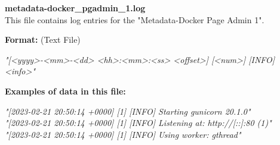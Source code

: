 \begin{description}
\begin{addmargin}[0em]{0em}
    \label{metadata-docker_pgadmin_1.log}
    \begin{addmargin}[1em]{0em} %
        \textbf{metadata-docker\_pgadmin\_1.log}\\
        This file contains log entries for the "Metadata-Docker Page Admin 1".
        \begin{addmargin}[1em]{0em}
            \textbf{Format:} (Text File)
            \begin{addmargin}[1em]{0em}
                \textit{"[<yyyy>-<mm>-<dd> <hh>:<mm>:<ss> <offset>] [<num>] [INFO] <info>"}
            \end{addmargin}
        \end{addmargin}
        \begin{addmargin}[1em]{0em}
            \textbf{Examples of data in this file:}
            \begin{addmargin}[1em]{0em}\textit{"[2023-02-21 20:50:14 +0000] [1] [INFO] Starting gunicorn 20.1.0"\\
                "[2023-02-21 20:50:14 +0000] [1] [INFO] Listening at: http://[::]:80 (1)"\\
                "[2023-02-21 20:50:14 +0000] [1] [INFO] Using worker: gthread"}
            \end{addmargin}
        \end{addmargin}
    \end{addmargin} %
    \textbf{\\}


\end{addmargin}
\end{description}
